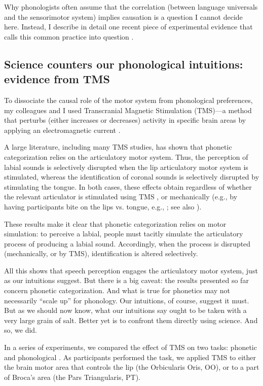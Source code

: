 \documentclass[output=paper,colorlinks,citecolor=brown
]{langscibook}
\begin{document}
Why phonologists often assume that the correlation (between language universals and the sensorimotor system) implies causation is a question I cannot decide here. Instead, I describe in detail one recent piece of experimental evidence that calls this common practice into question \citep{berent2023phonetic}. 

\subsection{Science counters our phonological intuitions: evidence from TMS}

To dissociate the causal role of the motor system from phonological preferences, my colleagues and I used Transcranial Magnetic Stimulation (TMS)—a method that perturbs (either increases or decreases) activity in specific brain areas by applying an electromagnetic current \citep{rossi2021safety}.  

A large literature, including many TMS studies, has shown that phonetic categorization relies on the articulatory motor system. Thus, the perception of labial sounds is selectively disrupted when the lip articulatory motor system is stimulated, whereas the identification of coronal sounds is selectively disrupted by stimulating the tongue. In both cases, these effects obtain regardless of whether the relevant articulator is stimulated using TMS \citep{d2012role, d2009motor, mottonen2009motor,smalle2015dissociating}, or mechanically (e.g., by having participants bite on the lips vs. tongue, e.g., \cite{bruderer2015sensorimotor}; see also \cite{berent2020speech}). 

These results make it clear that phonetic categorization relies on motor simulation: to perceive a labial, people must tacitly simulate the articulatory process of producing a labial sound. Accordingly, when the process is disrupted (mechanically, or by TMS), identification is altered selectively.  

All this shows that speech perception engages the articulatory motor system, just as our intuitions suggest. But there is a big caveat: the results presented so far concern phonetic categorization. And what is true for phonetics may not necessarily “scale up” for phonology. Our intuitions, of course, suggest it must. But as we should now know, what our intuitions say ought to be taken with a very large grain of salt. Better yet is to confront them directly using science. And so, we did.

In a series of experiments, we compared the effect of TMS on two tasks: phonetic and phonological \citep{berent2023phonetic}. As participants performed the task, we applied TMS to either the brain motor area that controls the lip (the Orbicularis Oris, OO), or to a part of Broca’s area (the Pars Triangularis, PT). 
\end{document}
